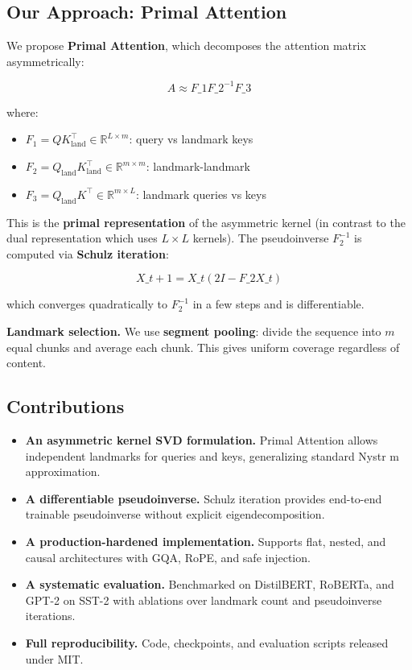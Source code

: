 \subsection{Our Approach: Primal Attention}

We propose \textbf{Primal Attention}, which decomposes the attention matrix 
asymmetrically:

\[
A \approx F\_1 F\_2^{-1} F\_3
\]

where:

\begin{itemize}
\item $F_1 = Q K_\text{land}^\top \in \mathbb{R}^{L \times m}$: query vs landmark keys
\item $F_2 = Q_\text{land} K_\text{land}^\top \in \mathbb{R}^{m \times m}$: landmark-landmark
\item $F_3 = Q_\text{land} K^\top \in \mathbb{R}^{m \times L}$: landmark queries vs keys

\end{itemize}
This is the \textbf{primal representation} of the asymmetric kernel (in contrast 
to the dual representation which uses $L \times L$ kernels). The pseudoinverse 
$F_2^{-1}$ is computed via \textbf{Schulz iteration}:

\[
X\_{t+1} = X\_t (2I - F\_2 X\_t)
\]

which converges quadratically to $F_2^{-1}$ in a few steps and is differentiable.

\textbf{Landmark selection.} We use \textbf{segment pooling}: divide the sequence into 
$m$ equal chunks and average each chunk. This gives uniform coverage 
regardless of content.

\subsection{Contributions}

\begin{itemize}
\item \textbf{An asymmetric kernel SVD formulation.} Primal Attention allows independent
  landmarks for queries and keys, generalizing standard Nystr m approximation.
\item \textbf{A differentiable pseudoinverse.} Schulz iteration provides end-to-end
  trainable pseudoinverse without explicit eigendecomposition.
\item \textbf{A production-hardened implementation.} Supports flat, nested, and causal
  architectures with GQA, RoPE, and safe injection.
\item \textbf{A systematic evaluation.} Benchmarked on DistilBERT, RoBERTa, and GPT-2
  on SST-2 with ablations over landmark count and pseudoinverse iterations.
\item \textbf{Full reproducibility.} Code, checkpoints, and evaluation scripts released
  under MIT.

\end{itemize}
